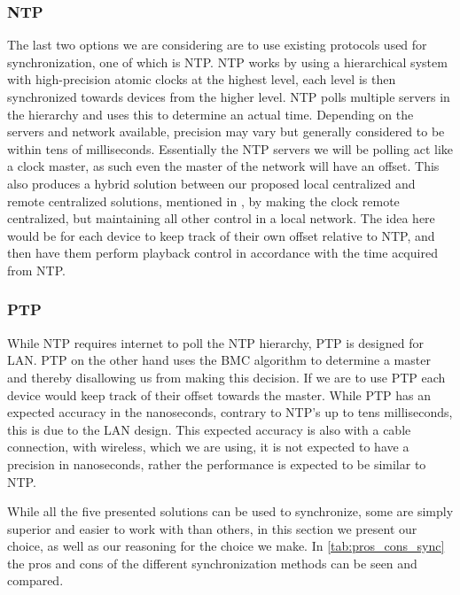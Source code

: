 \subsubsection{\acl{NTP}}
The last two options we are considering are to use existing protocols used for synchronization, one of which is \ac{NTP}.
\ac{NTP} works by using a hierarchical system with high-precision atomic clocks at the highest level, each level is then synchronized towards devices from the higher level.
\ac{NTP} polls multiple servers in the hierarchy and uses this to determine an actual time.
Depending on the servers and network available, precision may vary but generally considered to be within tens of milliseconds.
Essentially the \ac{NTP} servers we will be polling act like a clock master, as such even the master of the network will have an offset.
This also produces a hybrid solution between our proposed local centralized and remote centralized solutions, mentioned in , by making the clock remote centralized, but maintaining all other control in a local network.
The idea here would be for each device to keep track of their own offset relative to \ac{NTP}, and then have them perform playback control in accordance with the time acquired from \ac{NTP}.

\subsubsection{\acl{PTP}}
While \ac{NTP} requires internet to poll the \ac{NTP} hierarchy, \ac{PTP} is designed for LAN.
\ac{PTP} on the other hand uses the \ac{BMC} algorithm to determine a master and thereby disallowing us from making this decision.
If we are to use \ac{PTP} each device would keep track of their offset towards the master.
While \ac{PTP} has an expected accuracy in the nanoseconds, contrary to NTP's up to tens milliseconds, this is due to the LAN design.
This expected accuracy is also with a cable connection, with wireless, which we are using, it is not expected to have a precision in nanoseconds, rather the performance is expected to be similar to \ac{NTP}.

\bigskip
While all the five presented solutions can be used to synchronize, some are simply superior and easier to work with than others, in this section we present our choice, as well as our reasoning for the choice we make.
In \cref{tab:pros_cons_sync} the pros and cons of the different synchronization methods can be seen and compared.

